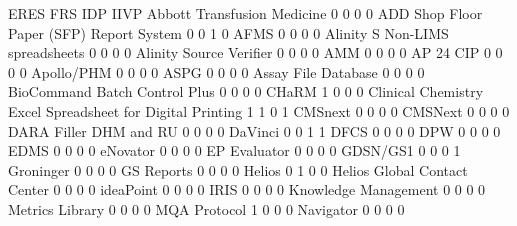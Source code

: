\documentclass{article}
\begin{document}
\begin{Schunk}
\begin{Soutput}
                                                            ERES FRS IDP IIVP
  Abbott Transfusion Medicine                                  0   0   0    0
  ADD Shop Floor Paper (SFP) Report System                     0   0   1    0
  AFMS                                                         0   0   0    0
  Alinity S Non-LIMS spreadsheets                              0   0   0    0
  Alinity Source Verifier                                      0   0   0    0
  AMM                                                          0   0   0    0
  AP 24 CIP                                                    0   0   0    0
  Apollo/PHM                                                   0   0   0    0
  ASPG                                                         0   0   0    0
  Assay File Database                                          0   0   0    0
  BioCommand Batch Control Plus                                0   0   0    0
  CHaRM                                                        1   0   0    0
  Clinical Chemistry Excel Spreadsheet for Digital Printing    1   1   0    1
  CMSnext                                                      0   0   0    0
  CMSNext                                                      0   0   0    0
  DARA Filler DHM and RU                                       0   0   0    0
  DaVinci                                                      0   0   1    1
  DFCS                                                         0   0   0    0
  DPW                                                          0   0   0    0
  EDMS                                                         0   0   0    0
  eNovator                                                     0   0   0    0
  EP Evaluator                                                 0   0   0    0
  GDSN/GS1                                                     0   0   0    1
  Groninger                                                    0   0   0    0
  GS Reports                                                   0   0   0    0
  Helios                                                       0   1   0    0
  Helios Global Contact Center                                 0   0   0    0
  ideaPoint                                                    0   0   0    0
  IRIS                                                         0   0   0    0
  Knowledge Management                                         0   0   0    0
  Metrics Library                                              0   0   0    0
  MQA Protocol                                                 1   0   0    0
  Navigator                                                    0   0   0    0

\end{Soutput}
\end{Schunk}
\end{document}

